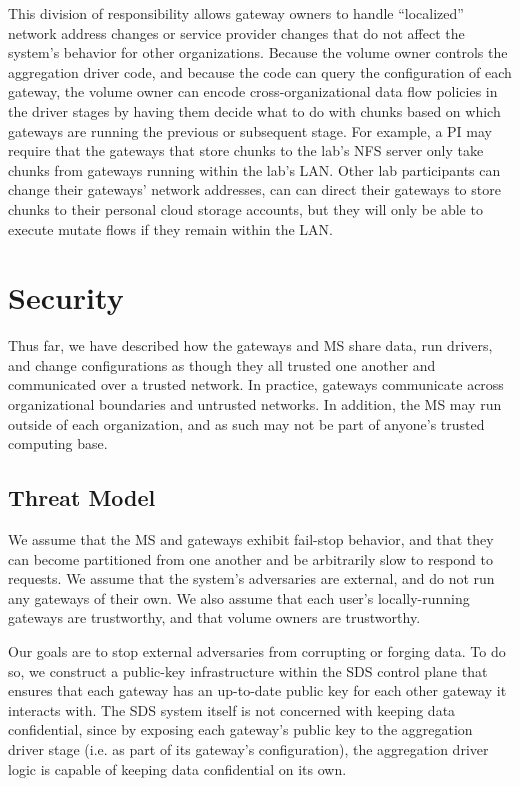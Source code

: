 This division of responsibility allows gateway owners to handle ``localized''
network address changes or service provider changes that do not affect the
system's behavior for other organizations.  Because the volume owner controls
the aggregation driver code, and because the code can query the 
configuration of each gateway, the volume owner can encode cross-organizational
data flow policies in the driver stages by having them decide what to do with
chunks based on which gateways are running the previous or subsequent stage.
For example, a PI may require that the gateways that store chunks
to the lab's NFS server only take chunks from gateways running within the lab's
LAN.  Other lab participants can change their gateways' network addresses, can
can direct their gateways to store chunks to their personal cloud storage
accounts, but they will only be able to execute mutate flows if they remain
within the LAN.

\section{Security}

Thus far, we have described how the gateways and MS share data, run drivers, and
change configurations as though they all trusted one another and communicated
over a trusted network.  In practice, gateways communicate across organizational
boundaries and untrusted networks.  In addition, the MS may run outside
of each organization, and as such may not be part of anyone's trusted
computing base.

\subsection{Threat Model}

We assume that the MS and gateways exhibit fail-stop behavior, and that they can
become partitioned from one another and be arbitrarily slow to respond to
requests.  We assume that the system's adversaries are external, and do not run
any gateways of their own.  We also assume that each user's locally-running
gateways are trustworthy, and that volume owners are trustworthy.

Our goals are to stop external adversaries from corrupting or forging
data.  To do so, we construct a public-key infrastructure within the SDS control
plane that ensures that each gateway has an up-to-date public key for each other
gateway it interacts with.  The SDS system itself is not concerned with keeping data
confidential, since by exposing each gateway's public key to the aggregation
driver stage (i.e. as part of its gateway's configuration),
the aggregation driver logic is capable of keeping data
confidential on its own.

